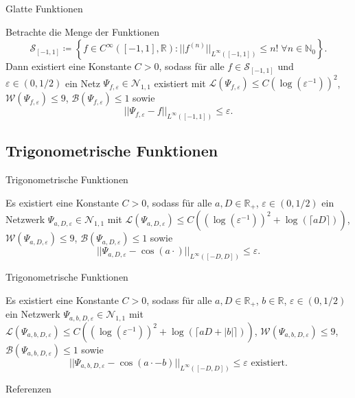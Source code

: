 \documentclass[10pt,aspectratio=169]{beamer}
\newcommand{\N}{\mathbb{N}} %
\newcommand{\R}{\mathbb{R}} %
\begin{document}
\begin{frame}{Glatte Funktionen}
    \begin{lemma} %
        Betrachte die Menge der Funktionen 
        \[ \mathcal{S}_{[-1,1]} \coloneqq \left\{ f \in C^\infty([-1,1], \R): ||f^{(n)}||_{L^\infty([-1,1])} \leq n! \;\forall n \in \N_0 \right\}. \]
        Dann existiert eine Konstante \(C>0\), sodass für alle \(f\in \mathcal{S}_{[-1,1]}\) und \(\varepsilon\in (0,1/2)\) 
        ein Netz \(\Psi_{f,\varepsilon} \in \mathcal{N}_{1,1}\) existiert mit 
        \( \mathcal{L}(\Psi_{f,\varepsilon}) \leq C(\log(\varepsilon^{-1}))^2 \), 
        \(\mathcal{W}(\Psi_{f,\varepsilon}) \leq 9\), \(\mathcal{B}(\Psi_{f,\varepsilon}) \leq 1\) 
        sowie 
        \[ ||\Psi_{f,\varepsilon} - f||_{L^\infty([-1,1])} \leq \varepsilon. \]
    \end{lemma}
\end{frame}

\subsection{Trigonometrische Funktionen}

\begin{frame}{Trigonometrische Funktionen}
    \begin{theorem} %
        \newcommand{\Psia}{\Psi_{a,D,\varepsilon}}
        Es existiert eine Konstante \(C>0\), sodass für alle \(a,D\in \R_+\), \(\varepsilon \in (0,1/2)\) 
        ein Netzwerk \(\Psia \in \mathcal{N}_{1,1}\) mit \(\mathcal{L}(\Psia) \leq C((\log(\varepsilon^{-1}))^2 + \log(\lceil aD\rceil))\), 
        \(\mathcal{W}(\Psia) \leq 9\), \(\mathcal{B}(\Psia) \leq 1\) sowie 
        \[ ||\Psia - \cos(a \cdot) ||_{L^{\infty}([-D,D])} \leq \varepsilon. \]
    \end{theorem}
\end{frame}

\begin{frame}{Trigonometrische Funktionen}
    \begin{corollary} %
        \newcommand{\Psia}{\Psi_{a,b,D,\varepsilon}}
        Es existiert eine Konstante \(C>0\), sodass für alle \(a,D\in \R_+\), \(b\in \R\), \(\varepsilon \in (0,1/2)\) 
        ein Netzwerk \(\Psia \in \mathcal{N}_{1,1} \) mit 
        \(\mathcal{L}(\Psia) \leq C((\log(\varepsilon^{-1}))^2 + \log(\lceil a D + |b| \rceil))\), 
        \(\mathcal{W}(\Psia) \leq 9\), \(\mathcal{B}(\Psia) \leq 1\) sowie 
        \[ ||\Psia - \cos(a \cdot - b) ||_{L^\infty([-D,D])} \leq \varepsilon \text{ existiert}. \]
    \end{corollary}
\end{frame}

\begin{frame}{Referenzen}
    \footnotesize
    \printbibliography[heading=none]
\end{frame}
\end{document}
